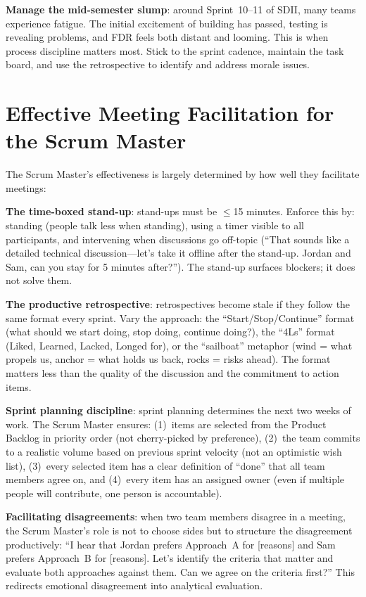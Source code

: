 \textbf{Manage the mid-semester slump}: around Sprint~10--11 of SDII, many teams experience fatigue. The initial excitement of building has passed, testing is revealing problems, and FDR feels both distant and looming. This is when process discipline matters most. Stick to the sprint cadence, maintain the task board, and use the retrospective to identify and address morale issues.



\section{Effective Meeting Facilitation for the Scrum Master}
The Scrum Master's effectiveness is largely determined by how well they facilitate meetings:

\textbf{The time-boxed stand-up}: stand-ups must be $\leq$15 minutes. Enforce this by: standing (people talk less when standing), using a timer visible to all participants, and intervening when discussions go off-topic (``That sounds like a detailed technical discussion---let's take it offline after the stand-up. Jordan and Sam, can you stay for 5 minutes after?''). The stand-up surfaces blockers; it does not solve them.

\textbf{The productive retrospective}: retrospectives become stale if they follow the same format every sprint. Vary the approach: the ``Start/Stop/Continue'' format (what should we start doing, stop doing, continue doing?), the ``4Ls'' format (Liked, Learned, Lacked, Longed for), or the ``sailboat'' metaphor (wind = what propels us, anchor = what holds us back, rocks = risks ahead). The format matters less than the quality of the discussion and the commitment to action items.

\textbf{Sprint planning discipline}: sprint planning determines the next two weeks of work. The Scrum Master ensures: (1)~items are selected from the Product Backlog in priority order (not cherry-picked by preference), (2)~the team commits to a realistic volume based on previous sprint velocity (not an optimistic wish list), (3)~every selected item has a clear definition of ``done'' that all team members agree on, and (4)~every item has an assigned owner (even if multiple people will contribute, one person is accountable).

\textbf{Facilitating disagreements}: when two team members disagree in a meeting, the Scrum Master's role is not to choose sides but to structure the disagreement productively: ``I hear that Jordan prefers Approach~A for [reasons] and Sam prefers Approach~B for [reasons]. Let's identify the criteria that matter and evaluate both approaches against them. Can we agree on the criteria first?'' This redirects emotional disagreement into analytical evaluation.



